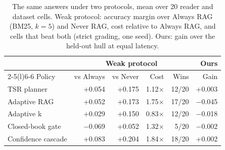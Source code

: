 \begin{table}[t]
\centering\footnotesize
\setlength{\tabcolsep}{3pt}
\caption{The same answers under two protocols, mean over 20 reader and dataset cells. Weak protocol: accuracy margin over Always RAG (BM25, $k=5$) and Never RAG, cost relative to Always RAG, and cells that beat both (strict grading, one seed). Ours: gain over the held-out hull at equal latency.}
\label{tab:p_weak}
\begin{tabular*}{\linewidth}{@{\extracolsep{\fill}}lrrrrr@{}}
\toprule
 & \multicolumn{4}{c}{Weak protocol} & Ours \\
\cmidrule(lr){2-5}\cmidrule(l){6-6}
Policy & vs Always & vs Never & Cost & Wins & Gain \\
\midrule
TSR planner & +0.054 & +0.175 & 1.12$\times$ & 12/20 & +0.003 \\
Adaptive RAG & +0.052 & +0.173 & 1.75$\times$ & 17/20 & $-$0.045 \\
Adaptive k & +0.029 & +0.150 & 0.83$\times$ & 12/20 & $-$0.018 \\
Closed-book gate & $-$0.069 & +0.052 & 1.32$\times$ & 5/20 & $-$0.002 \\
Confidence cascade & +0.083 & +0.204 & 1.84$\times$ & 18/20 & +0.002 \\
\bottomrule
\end{tabular*}
\end{table}
